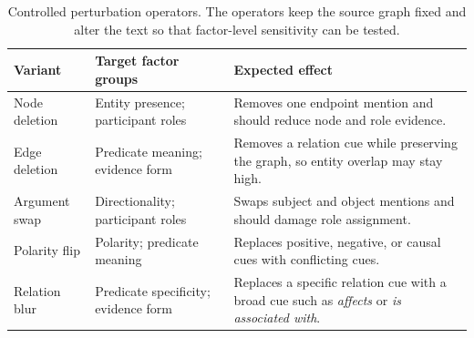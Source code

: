 \begin{table}[t]
\centering
\caption{Controlled perturbation operators. The operators keep the source graph fixed and alter the text so that factor-level sensitivity can be tested.}
\label{tab:perturbation-design}
\scriptsize
\begin{tabularx}{\linewidth}{lYY}
\toprule
Variant & Target factor groups & Expected effect \\
\midrule
Node deletion & Entity presence; participant roles & Removes one endpoint mention and should reduce node and role evidence. \\
Edge deletion & Predicate meaning; evidence form & Removes a relation cue while preserving the graph, so entity overlap may stay high. \\
Argument swap & Directionality; participant roles & Swaps subject and object mentions and should damage role assignment. \\
Polarity flip & Polarity; predicate meaning & Replaces positive, negative, or causal cues with conflicting cues. \\
Relation blur & Predicate specificity; evidence form & Replaces a specific relation cue with a broad cue such as \emph{affects} or \emph{is associated with}. \\
\bottomrule
\end{tabularx}
\end{table}
